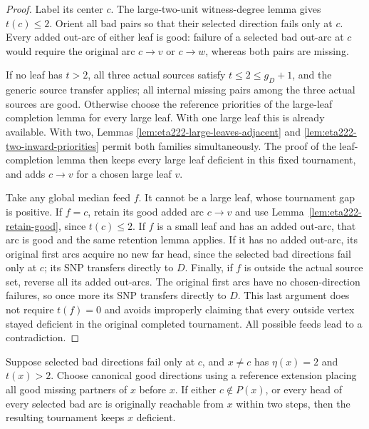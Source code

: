 \begin{proof}
Label its center $c$. The large-two-unit witness-degree lemma gives
$t(c)\le2$. Orient all bad pairs so that their selected direction
fails only at $c$. Every added out-arc of either leaf is good:
failure of a selected bad out-arc at $c$ would require the original
arc $c\to v$ or $c\to w$, whereas both pairs are missing.

If no leaf has $t>2$, all three actual sources satisfy
$t\le2\le g_D+1$, and the generic source transfer applies;
all internal missing pairs among the three actual sources are good.
Otherwise choose the reference priorities of the large-leaf
completion lemma for every large leaf. With one large leaf this is
already available. With two, Lemmas
\ref{lem:eta222-large-leaves-adjacent} and
\ref{lem:eta222-two-inward-priorities} permit both families
simultaneously. The proof of the leaf-completion lemma
then keeps every large leaf deficient in this fixed tournament, and
adds $c\to v$ for a chosen large leaf $v$.

Take any global median feed $f$.
It cannot be a large leaf, whose tournament gap is positive.
If $f=c$, retain its good added arc $c\to v$ and use
Lemma~\ref{lem:eta222-retain-good}, since $t(c)\le2$.
If $f$ is a small leaf and has an added out-arc, that arc is good
and the same retention lemma applies. If it has no added out-arc,
its original first arcs acquire no new far head, since the selected
bad directions fail only at $c$; its SNP transfers directly to $D$.
Finally, if $f$ is outside the actual source set, reverse all its
added out-arcs. The original first arcs have no chosen-direction
failures, so once more its SNP transfers directly to $D$.
This last argument does not require $t(f)=0$ and avoids improperly
claiming that every outside vertex stayed deficient in the original
completed tournament. All possible feeds lead to a contradiction.
\end{proof}

\begin{lemma}
\label{lem:eta222-large-nonselected}
Suppose selected bad directions fail only at $c$, and $x\ne c$
has $\eta(x)=2$ and $t(x)>2$. Choose canonical good directions
using a reference extension placing all good missing partners of
$x$ before $x$. If either $c\notin P(x)$, or every head of every selected
bad arc is originally reachable from $x$ within two steps, then the
resulting tournament keeps $x$ deficient.
\end{lemma}

